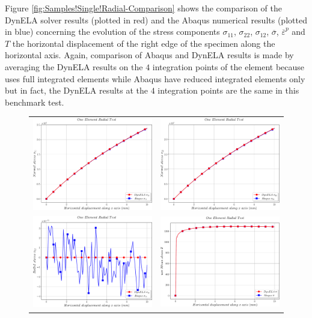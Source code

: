 Figure \ref{fig:Samples!Single!Radial-Comparison} shows the comparison
of the DynELA solver results (plotted in red) and the Abaqus numerical
results (plotted in blue) concerning the evolution of the stress components
$\sigma_{11}$, $\sigma_{22}$, $\sigma_{12}$, $\overline{\sigma}$,
$\overline{\varepsilon}^{p}$ and $T$ \versus  the horizontal displacement
of the right edge of the specimen along the horizontal axis. Again,
comparison of Abaqus and DynELA results is made by averaging the DynELA
results on the $4$ integration points of the element because \DynELA uses
full integrated elements while Abaqus have reduced integrated elements
only but in fact, the DynELA results at the $4$ integration points
are the same in this benchmark test.

\begin{figure}[h]
\begin{centering}
\begin{tabular}{cc}
\includegraphics[width=0.45\columnwidth]{Figures/Samples/Element/Radial_stress_11} & \includegraphics[width=0.45\columnwidth]{Figures/Samples/Element/Radial_stress_22}\tabularnewline
\includegraphics[width=0.45\columnwidth]{Figures/Samples/Element/Radial_stress_12} & \includegraphics[width=0.45\columnwidth]{Figures/Samples/Element/Radial_vonMises}\tabularnewline

\end{tabular}
\end{centering}
\end{figure}
